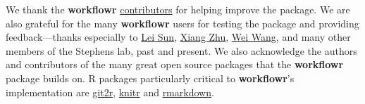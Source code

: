 \documentclass[9pt,a4paper]{extarticle}
\begin{document}
We thank the \textbf{workflowr}
\href{https://github.com/jdblischak/workflowr/graphs/contributors}{contributors}
for helping improve the package. We are also grateful for the many
 \textbf{workflowr} users for testing the package and providing feedback---thanks
especially to \href{https://github.com/LSun}{Lei Sun},
\href{https://github.com/xiangzhu}{Xiang Zhu},
\href{https://github.com/NKweiwang}{Wei Wang}, and many other members of
the Stephens lab, past and present. We also acknowledge the authors and
contributors of the many great open source packages that the \textbf{workflowr}
package builds on. R packages particularly critical to \textbf{workflowr}'s
implementation are
\href{https://cran.r-project.org/web/packages/git2r/index.html}{git2r},
\href{https://github.com/yihui/knitr}{knitr} and
\href{http://rmarkdown.rstudio.com/}{rmarkdown}.

{\small

}
\end{document}
